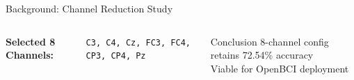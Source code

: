 \documentclass[aspectratio=169, 11pt]{beamer}
\begin{document}
\begin{frame}{Background: Channel Reduction Study}
\begin{columns}[T]
        \vspace{1mm}
        \textbf{Selected 8 Channels:}
        \begin{center}
            \texttt{C3, C4, Cz, FC3, FC4, CP3, CP4, Pz}
        \end{center}
        
        \vspace{1mm}
        \begin{exampleblock}{Conclusion}
            8-channel config retains 72.54\% accuracy\\
            Viable for OpenBCI deployment
        \end{exampleblock}
    \end{columns}
\end{frame}

\end{document}
